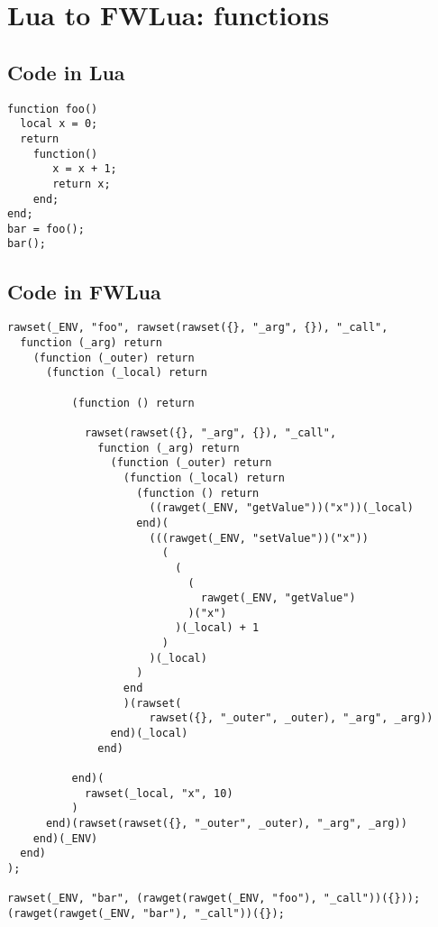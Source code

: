 \chapter{Lua to FWLua: functions\label{app:function}}

\section{Code in Lua}

\begin{verbatim}
function foo()
  local x = 0;
  return 
    function() 
       x = x + 1;
       return x; 
    end;
end;
bar = foo();
bar();
\end{verbatim}

\newpage
\section{Code in FWLua}

\begin{verbatim}
rawset(_ENV, "foo", rawset(rawset({}, "_arg", {}), "_call",
  function (_arg) return
    (function (_outer) return
      (function (_local) return

          (function () return

            rawset(rawset({}, "_arg", {}), "_call",
              function (_arg) return
                (function (_outer) return
                  (function (_local) return
                    (function () return
                      ((rawget(_ENV, "getValue"))("x"))(_local)
                    end)(
                      (((rawget(_ENV, "setValue"))("x"))
                        (
                          (
                            (
                              rawget(_ENV, "getValue")
                            )("x")
                          )(_local) + 1
                        )
                      )(_local)
                    )
                  end
                  )(rawset(
                      rawset({}, "_outer", _outer), "_arg", _arg))
                end)(_local)
              end)

          end)(
            rawset(_local, "x", 10)
          )
      end)(rawset(rawset({}, "_outer", _outer), "_arg", _arg))
    end)(_ENV)
  end)
);

rawset(_ENV, "bar", (rawget(rawget(_ENV, "foo"), "_call"))({}));
(rawget(rawget(_ENV, "bar"), "_call"))({});
\end{verbatim}
